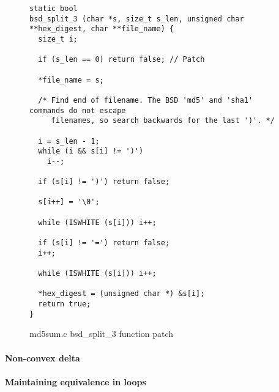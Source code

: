 \begin{figure}[ht]
\centering
\begin{lstlisting}
static bool
bsd_split_3 (char *s, size_t s_len, unsigned char **hex_digest, char **file_name) {
  size_t i;

  if (s_len == 0) return false; // Patch

  *file_name = s;

  /* Find end of filename. The BSD 'md5' and 'sha1' commands do not escape
     filenames, so search backwards for the last ')'. */

  i = s_len - 1;
  while (i && s[i] != ')')
    i--;

  if (s[i] != ')') return false;

  s[i++] = '\0';

  while (ISWHITE (s[i])) i++;

  if (s[i] != '=') return false;
  i++;

  while (ISWHITE (s[i])) i++;

  *hex_digest = (unsigned char *) &s[i];
  return true;
}
\end{lstlisting}
\caption{md5sum.c bsd\_split\_3 function patch}
\end{figure}

\paragraph{Non-convex delta}

\paragraph{Maintaining equivalence in loops}

